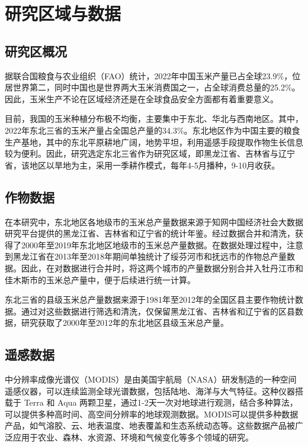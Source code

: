 \cleardoublepage

\section{研究区域与数据}
\subsection{研究区概况}
\par 据联合国粮食与农业组织（FAO）统计，2022年中国玉米产量已占全球23.9\%，位居世界第二，同时中国也是世界两大玉米消费国之一，占全球消费总量的25.2\%。因此，玉米生产不论在区域经济还是在全球食品安全方面都有着重要意义。
\par 目前，我国的玉米种植分布极不均衡，主要集中于东北、华北与西南地区。其中，2022年东北三省的玉米产量占全国总产量的34.3\%。东北地区作为中国主要的粮食生产基地，其中的东北平原耕地广阔，地势平坦，利用遥感手段提取作物生长信息较为便利。因此，研究选定东北三省作为研究区域，即黑龙江省、吉林省与辽宁省，该地区以旱地为主，采用一季耕作模式，每年4-5月播种，9-10月收获。

\subsection{作物数据}
\par 在本研究中，东北地区各地级市的玉米总产量数据来源于知网中国经济社会大数据研究平台提供的黑龙江省、吉林省和辽宁省的统计年鉴。经过数据合并和清洗，获得了2000年至2019年东北地区地级市的玉米总产量数据。在数据处理过程中，注意到黑龙江省在2013年至2018年期间单独统计了绥芬河市和抚远市的作物总产量数据。因此，在对数据进行合并时，将这两个城市的产量数据分别合并入牡丹江市和佳木斯市的玉米总产量中，便于后续进行统一计算。

\par 东北三省的县级玉米总产量数据来源于1981年至2012年的全国区县主要作物统计数据。通过对这些数据进行筛选和清洗，仅保留黑龙江省、吉林省和辽宁省的区县数据，研究获取了2000年至2012年的东北地区县级玉米总产量。

\subsection{遥感数据}
\par 中分辨率成像光谱仪（MODIS）是由美国宇航局（NASA）研发制造的一种空间遥感仪器，可以连续监测全球光谱数据，包括陆地、海洋与大气特征。这种仪器搭载于 Terra 和 Aqua 两颗卫星，通过1-2天一次对地球进行观测，结合多种算法，可以提供多种高时间、高空间分辨率的地球观测数据。MODIS可以提供多种数据产品，如气溶胶、云、地表温度、地表覆盖和生态系统动态等。这些数据产品被广泛应用于农业、森林、水资源、环境和气候变化等多个领域的研究。

